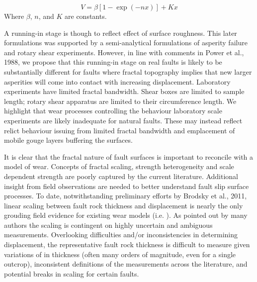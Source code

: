 \documentclass[12pt,a4paper]{article}
\begin{document}
\begin{equation}
   V = \beta \left[ 1-\exp(-nx)\right] +Kx
\end{equation}
%
Where $\beta$, $n$, and $K$ are constants. 

	A running-in stage is though to reflect effect of surface roughness. This later formulations was supported by a semi-analytical formulations of asperity failure and rotary shear experiments. However, in line with comments in Power et al., 1988, we propose that this running-in stage on real faults is likely to be substantially different for faults where fractal topography implies that new larger asperities will come into contact with increasing displacement. Laboratory experiments have limited fractal bandwidth. Shear boxes are limited to sample length; rotary shear apparatus are limited to their circumference length. We highlight that wear processes controlling the behaviour laboratory scale experiments are likely inadequate for natural faults. These may instead reflect relict behaviour issuing from limited fractal bandwidth and emplacement of mobile gouge layers buffering the surfaces.
   

It is clear that the fractal nature of fault surfaces is important to reconcile with a model of wear. Concepts of fractal scaling, strength heterogeneity and scale dependent strength are poorly captured by the current literature. Additional insight from field observations are needed to better understand fault slip surface processes. To date, notwithstanding preliminary efforts by Brodsky et al., 2011, linear scaling between fault rock thickness and displacement is nearly the only grouding field evidence for existing wear models (i.e. \cite{scholz1987wear, wang1994wear, power1988roughness}). As pointed out by many authors \cite{blenkinsop1989thickness, evans1990thickness, shipton2006thick} the scaling is contingent on highly uncertain and ambiguous measurements. Overlooking difficulties and/or inconsistencies in determining displacement, the representative fault rock thickness is difficult to measure given variations of in thickness (often many orders of magnitude, even for a single outcrop), inconsistent definitions of the measurements across the literature, and potential breaks in scaling for certain faults. 
\end{document}
